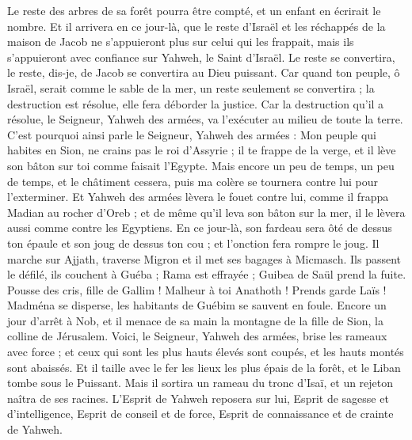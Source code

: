 \begin{multicols}{2}
Le reste des arbres de sa forêt pourra être compté, et un enfant en écrirait le nombre.
Et il arrivera en ce jour-là, que le reste d'Israël et les réchappés de la maison de Jacob ne s'appuieront plus sur celui qui les frappait, mais ils s'appuieront avec confiance sur Yahweh, le Saint d'Israël.
Le reste se convertira, le reste, dis-je, de Jacob se convertira au Dieu puissant.
Car quand ton peuple, ô Israël, serait comme le sable de la mer, un reste seulement se convertira ; la destruction est résolue, elle fera déborder la justice.
Car la destruction qu'il a résolue, le Seigneur, Yahweh des armées, va l'exécuter au milieu de toute la terre.
C'est pourquoi ainsi parle le Seigneur, Yahweh des armées : Mon peuple qui habites en Sion, ne crains pas le roi d'Assyrie ; il te frappe de la verge, et il lève son bâton sur toi comme faisait l'Egypte.
Mais encore un peu de temps, un peu de temps, et le châtiment cessera, puis ma colère se tournera contre lui pour l'exterminer.
Et Yahweh des armées lèvera le fouet contre lui, comme il frappa Madian au rocher d'Oreb ; et de même qu'il leva son bâton sur la mer, il le lèvera aussi comme contre les Egyptiens.
En ce jour-là, son fardeau sera ôté de dessus ton épaule et son joug de dessus ton cou ; et l'onction fera rompre le joug.
Il marche sur Ajjath, traverse Migron et il met ses bagages à Micmasch.
Ils passent le défilé, ils couchent à Guéba ; Rama est effrayée ; Guibea de Saül prend la fuite.
Pousse des cris, fille de Gallim ! Malheur à toi Anathoth ! Prends garde Laïs !
Madména se disperse, les habitants de Guébim se sauvent en foule.
Encore un jour d'arrêt à Nob, et il menace de sa main la montagne de la fille de Sion, la colline de Jérusalem.
Voici, le Seigneur, Yahweh des armées, brise les rameaux avec force ; et ceux qui sont les plus hauts élevés sont coupés, et les hauts montés sont abaissés.
Et il taille avec le fer les lieux les plus épais de la forêt, et le Liban tombe sous le Puissant.
\VerseOne{}Mais il sortira un rameau du tronc d'Isaï, et un rejeton naîtra de ses racines.
L'Esprit de Yahweh reposera sur lui, Esprit de sagesse et d'intelligence, Esprit de conseil et de force, Esprit de connaissance et de crainte de Yahweh.

\end{multicols}
